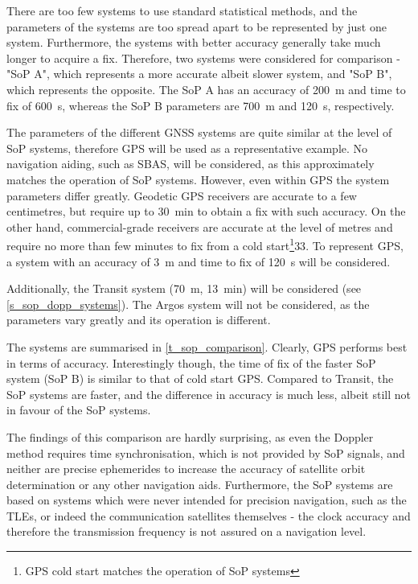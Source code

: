 There are too few systems to use standard statistical methods, and the parameters of the systems are too spread apart to be represented by just one system. Furthermore, the systems with better accuracy generally take much longer to acquire a fix. Therefore, two systems were considered for comparison - "SoP A", which represents a more accurate albeit slower system, and "SoP B", which represents the opposite. The SoP A has an accuracy of \qty{200}{m} and time to fix of \qty{600}{s}, whereas the SoP B parameters are \qty{700}{m} and \qty{120}{s}, respectively.

The parameters of the different GNSS systems are quite similar at the level of SoP systems\cite{sop23}, therefore GPS will be used as a representative example. No navigation aiding, such as SBAS, will be considered, as this approximately matches the operation of SoP systems. However, even within GPS the system parameters differ greatly. Geodetic GPS receivers are accurate to a few centimetres, but require up to \qty{30}{min} to obtain a fix with such accuracy\cite{sop23}. On the other hand, commercial-grade receivers are accurate at the level of metres and require no more than few minutes to fix from a cold start\footnote{GPS cold start matches the operation of SoP systems}\citep{pos04}{33}. To represent GPS, a system with an accuracy of \qty{3}{m} and time to fix of \qty{120}{s} will be considered.

Additionally, the Transit system (\qty{70}{m}, \qty{13}{min}) will be considered (see \autoref{s_sop_dopp_systems}). The Argos system will not be considered, as the parameters vary greatly and its operation is different.

The systems are summarised in \autoref{t_sop_comparison}. Clearly, GPS performs best in terms of accuracy. Interestingly though, the time of fix of the faster SoP system (SoP B) is similar to that of cold start GPS. Compared to Transit, the SoP systems are faster, and the difference in accuracy is much less, albeit still not in favour of the SoP systems. 

The findings of this comparison are hardly surprising, as even the Doppler method requires time synchronisation, which is not provided by SoP signals, and neither are precise ephemerides to increase the accuracy of satellite orbit determination or any other navigation aids. Furthermore, the SoP systems are based on systems which were never intended for precision navigation, such as the TLEs, or indeed the communication satellites themselves - the clock accuracy and therefore the transmission frequency is not assured on a navigation level.

